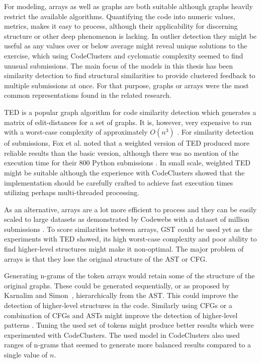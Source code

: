 For modeling, arrays as well as graphs are both suitable although graphs heavily restrict the available algorithms. Quantifying the code into numeric values, metrics, makes it easy to process, although their applicability for discerning structure or other deep phenomenon is lacking. In outlier detection they might be useful as any values over or below average might reveal unique solutions to the exercise, which using CodeClusters and cyclomatic complexity seemed to find unusual submissions. The main focus of the models in this thesis has been similarity detection to find structural similarities to provide clustered feedback to multiple submissions at once. For that purpose, graphs or arrays were the most common representations found in the related research\cite{fox-clust-leverage-2015, fox-roy-autostyle-msc-2016, codewebs, divide-and-correct, glassman-reusable-feedback}.

TED\cite{zhang-et-al-1989} is a popular graph algorithm for code similarity detection which generates a matrix of edit-distances for a set of graphs. It is, however, very expensive to run with a worst-case complexity of approximately $O(n^3)$ \cite{ted-demaine}. For similarity detection of submissions, Fox et al. noted that a weighted version of TED produced more reliable results than the basic version, although there was no mention of the execution time for their 800 Python submissions \cite{fox-clust-leverage-2015}. In small scale, weighted TED might be suitable although the experience with CodeClusters showed that the implementation should be carefully crafted to achieve fast execution times utilizing perhaps multi-threaded processing.

As an alternative, arrays are a lot more efficient to process and they can be easily scaled to large datasets as demonstrated by Codewebs with a dataset of million submissions \cite{codewebs}. To score similarities between arrays, GST\cite{wise-gst-1993} could be used yet as the experiments with TED showed, its high worst-case complexity and poor ability to find higher-level structures might make it non-optimal. The major problem of arrays is that they lose the original structure of the AST or CFG.

Generating n-grams of the token arrays would retain some of the structure of the original graphs. These could be generated sequentially, or as proposed by Karnalim and Simon~\cite{simon-better-ngrams-2020}, hierarchically from the AST. This could improve the detection of higher-level structures in the code. Similarly using CFGs or a combination of CFGs and ASTs might improve the detection of higher-level patterns \cite{cfast}. Tuning the used set of tokens might produce better results which were experimented with CodeClusters\cite{jplag, wahlroos-2019}. The used model in CodeClusters also used ranges of n-grams that seemed to generate more balanced results compared to a single value of $n$.

